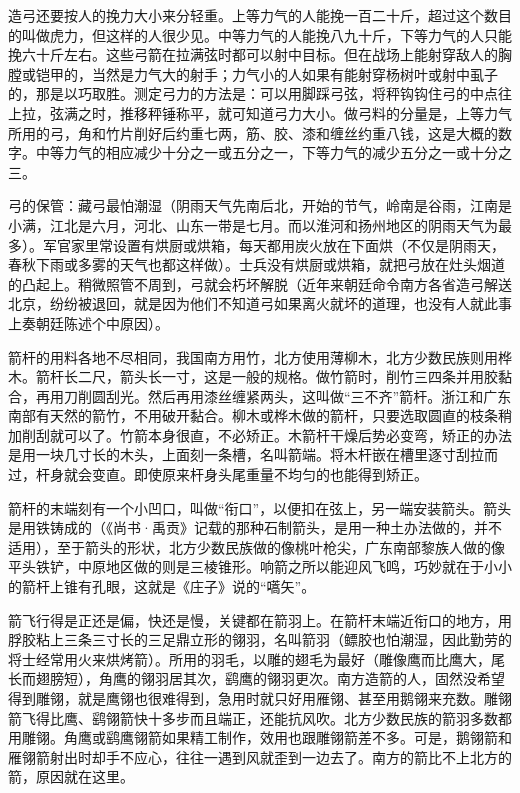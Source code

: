 \documentclass[12pt,UTF8]{ctexbook}
\begin{document}
造弓还要按人的挽力大小来分轻重。上等力气的人能挽一百二十斤，超过这个数目的叫做虎力，但这样的人很少见。中等力气的人能挽八九十斤，下等力气的人只能挽六十斤左右。这些弓箭在拉满弦时都可以射中目标。但在战场上能射穿敌人的胸膛或铠甲的，当然是力气大的射手；力气小的人如果有能射穿杨树叶或射中虱子的，那是以巧取胜。测定弓力的方法是：可以用脚踩弓弦，将秤钩钩住弓的中点往上拉，弦满之时，推移秤锤称平，就可知道弓力大小。做弓料的分量是，上等力气所用的弓，角和竹片削好后约重七两，筋、胶、漆和缠丝约重八钱，这是大概的数字。中等力气的相应减少十分之一或五分之一，下等力气的减少五分之一或十分之三。

弓的保管：藏弓最怕潮湿（阴雨天气先南后北，开始的节气，岭南是谷雨，江南是小满，江北是六月，河北、山东一带是七月。而以淮河和扬州地区的阴雨天气为最多）。军官家里常设置有烘厨或烘箱，每天都用炭火放在下面烘（不仅是阴雨天，春秋下雨或多雾的天气也都这样做）。士兵没有烘厨或烘箱，就把弓放在灶头烟道的凸起上。稍微照管不周到，弓就会朽坏解脱（近年来朝廷命令南方各省造弓解送北京，纷纷被退回，就是因为他们不知道弓如果离火就坏的道理，也没有人就此事上奏朝廷陈述个中原因）。

箭杆的用料各地不尽相同，我国南方用竹，北方使用薄柳木，北方少数民族则用桦木。箭杆长二尺，箭头长一寸，这是一般的规格。做竹箭时，削竹三四条并用胶黏合，再用刀削圆刮光。然后再用漆丝缠紧两头，这叫做“三不齐”箭杆。浙江和广东南部有天然的箭竹，不用破开黏合。柳木或桦木做的箭杆，只要选取圆直的枝条稍加削刮就可以了。竹箭本身很直，不必矫正。木箭杆干燥后势必变弯，矫正的办法是用一块几寸长的木头，上面刻一条槽，名叫箭端。将木杆嵌在槽里逐寸刮拉而过，杆身就会变直。即使原来杆身头尾重量不均匀的也能得到矫正。

箭杆的末端刻有一个小凹口，叫做“衔口”，以便扣在弦上，另一端安装箭头。箭头是用铁铸成的（《尚书·禹贡》记载的那种石制箭头，是用一种土办法做的，并不适用），至于箭头的形状，北方少数民族做的像桃叶枪尖，广东南部黎族人做的像平头铁铲，中原地区做的则是三棱锥形。响箭之所以能迎风飞鸣，巧妙就在于小小的箭杆上锥有孔眼，这就是《庄子》说的“嚆矢”。

箭飞行得是正还是偏，快还是慢，关键都在箭羽上。在箭杆末端近衔口的地方，用脬胶粘上三条三寸长的三足鼎立形的翎羽，名叫箭羽（鳔胶也怕潮湿，因此勤劳的将士经常用火来烘烤箭）。所用的羽毛，以雕的翅毛为最好（雕像鹰而比鹰大，尾长而翅膀短），角鹰的翎羽居其次，鹞鹰的翎羽更次。南方造箭的人，固然没希望得到雕翎，就是鹰翎也很难得到，急用时就只好用雁翎、甚至用鹅翎来充数。雕翎箭飞得比鹰、鹞翎箭快十多步而且端正，还能抗风吹。北方少数民族的箭羽多数都用雕翎。角鹰或鹞鹰翎箭如果精工制作，效用也跟雕翎箭差不多。可是，鹅翎箭和雁翎箭射出时却手不应心，往往一遇到风就歪到一边去了。南方的箭比不上北方的箭，原因就在这里。
\end{document}
